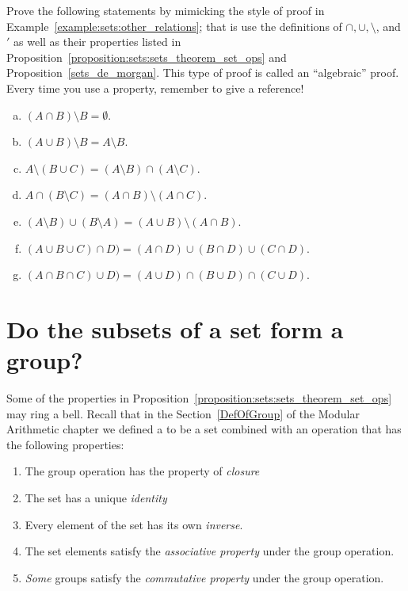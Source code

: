 \begin{exercise}{30}
Prove the following statements by mimicking the style of proof in Example~\ref{example:sets:other_relations}; that is use the definitions of $\cap, \cup, \setminus$, and $'$ as well as their properties listed in Proposition~\ref{proposition:sets:sets_theorem_set_ops} and  Proposition~\ref{sets_de_morgan}. This type of proof is called an ``algebraic'' proof.  Every time you use a property, remember to give a reference!
\begin{enumerate}[(a)]
\item
$(A \cap B) \setminus B = \emptyset$.
\item
$(A \cup B) \setminus B = A \setminus B$.
\item
$A \setminus (B \cup C) = (A \setminus B) \cap (A \setminus C)$. 
\item
 $A \cap (B \setminus C) = (A \cap B) \setminus (A \cap C)$. 
\item
$(A \setminus B) \cup (B \setminus A) = (A \cup B) \setminus (A \cap B)$. 
\item
$(A \cup B \cup C) \cap D) = (A \cap D) \cup (B \cap D)\cup (C \cap D)$. 
\item
$(A \cap B \cap C) \cup D) = (A \cup D) \cap (B \cup D)\cap (C \cup D)$. 
\end{enumerate}
\end{exercise}

\section{Do the subsets of a set form a group?}\label{SetGroup} 
Some of the properties in Proposition~\ref{proposition:sets:sets_theorem_set_ops} may ring a bell. Recall that in the Section~\ref{DefOfGroup} of the Modular Arithmetic chapter  we defined a  to be a set combined with an operation that has the following properties:
\begin{enumerate}
\item
The group operation has the property of \emph{closure}
\item
The set has  a unique \emph{identity}
\item
Every element of the set has its own \emph{inverse}.
\item
The set elements satisfy the \emph{associative property} under the group operation.
\item
\emph{Some} groups satisfy the \emph{commutative property} under the group operation.
\end{enumerate}

